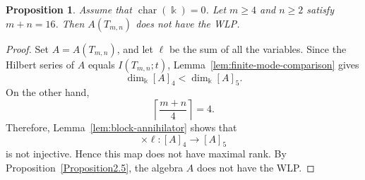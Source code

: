 \documentclass[12pt,twoside]{amsart}
\newtheorem{proposition}[thm]{Proposition}
\theoremstyle{definition}
\theoremstyle{mystyle}
\begin{document}
\begin{proposition}\label{lem:special-sums}
	Assume that $\operatorname{char}(\Bbbk)=0$.
	Let $m\geq4$ and $n\geq2$ satisfy $m+n=16$.
	Then $A(T_{m,n})$ does not have the WLP.
\end{proposition}

\begin{proof}
	Set $A=A(T_{m,n})$, and let $\ell$ be the sum of all
	the variables. Since the Hilbert series of $A$ equals
	$I(T_{m,n};t)$, Lemma~\ref{lem:finite-mode-comparison}
	gives
	\[
	\dim_{\Bbbk}[A]_4<\dim_{\Bbbk}[A]_5.
	\]
	On the other hand,
	\[
	\left\lceil\frac{m+n}{4}\right\rceil=4.
	\]
	Therefore, Lemma~\ref{lem:block-annihilator} shows that
	\[
	\times\ell:[A]_4\longrightarrow[A]_5
	\]
	is not injective. Hence this map does not have maximal
	rank. By Proposition~\ref{Proposition2.5}, the algebra
	$A$ does not have the WLP.
\end{proof}
\end{document}
